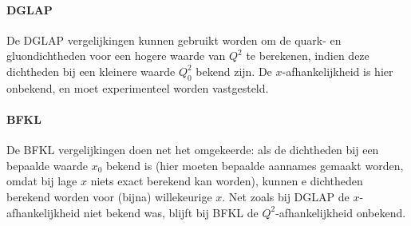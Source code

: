\documentclass[a4paper,11pt]{article}
\numberwithin{equation}{section} %
\begin{document}
      \paragraph{DGLAP} \label{sec:DGLAP}
De DGLAP vergelijkingen kunnen gebruikt worden om de quark- en gluondichtheden voor een hogere waarde van $Q^2$ te berekenen, indien deze dichtheden bij een kleinere waarde $Q_0^2$ bekend zijn.
De $x$-afhankelijkheid is hier onbekend, en moet experimenteel worden vastgesteld.

      \paragraph{BFKL}
De BFKL vergelijkingen doen net het omgekeerde: als de dichtheden bij een bepaalde waarde $x_0$ bekend is (hier moeten bepaalde aannames gemaakt worden, omdat bij lage $x$ niets exact berekend kan worden), kunnen e dichtheden berekend worden voor (bijna) willekeurige $x$.
Net zoals bij DGLAP de $x$-afhankelijkheid niet bekend was, blijft bij BFKL de $Q^2$-afhankelijkheid onbekend.
\end{document}
